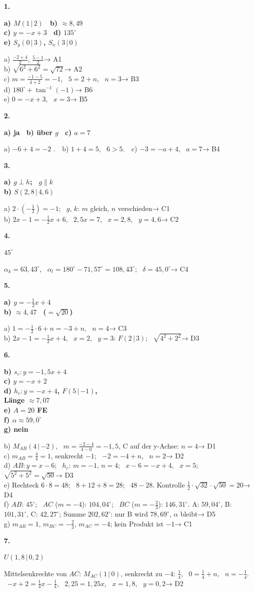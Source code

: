 \documentclass[11pt]{article}
\newcommand{\Pk}[3]{\ensuremath{#1(#2\,|\,{#3})}}
\newcommand{\lk}[2]{\par\Needspace{30mm}\vspace{6pt}\noindent\colorbox{black!12}{\makebox[9mm]{\bfseries\strut #1}}\hspace{2mm}{\bfseries #2}\par\vspace{4pt}}
\newcommand{\lsg}[3]{\par\noindent\begin{minipage}[t]{7mm}\textbf{#1}\end{minipage}%
  \begin{minipage}[t]{50mm}\raggedright\bfseries\boldmath #2\end{minipage}\hspace{3mm}%
  \begin{minipage}[t]{\dimexpr\linewidth-60mm\relax}\raggedright\small #3\end{minipage}\par\vspace{3pt}}
\newcommand{\ab}[1]{\hfill{\scriptsize\color{mbgrau}→ #1}}
\begin{document}
\lk{T}{Probetest}
\lsg{1.}{a) \Pk{M}{1}{2} \ b) $\approx 8{,}49$\\ c) $y = -x + 3$ \ d) $135^\circ$\\ e) \Pk{S_y}{0}{3}, \Pk{S_x}{3}{0}}{a) $\tfrac{-2+4}{2}$, $\tfrac{5-1}{2}$\ab{A1}\\ b) $\sqrt{6^2+6^2} = \sqrt{72}$\ab{A2}\\ c) $m = \tfrac{-1-5}{4+2} = -1$, \ $5 = 2 + n$, \ $n = 3$\ab{B3}\\ d) $180^\circ + \tan^{-1}(-1)$\ab{B6}\\ e) $0 = -x + 3$, \ $x = 3$\ab{B5}}
\lsg{2.}{a) ja \ b) über $g$ \ c) $a = 7$}{a) $-6 + 4 = -2$ \checkmark.\ \ b) $1 + 4 = 5$, \ $6 > 5$.\ \ c) $-3 = -a + 4$, \ $a = 7$\ab{B4}}
\lsg{3.}{a) $g \perp h$; \ $g \parallel k$\\ b) \Pk{S}{2{,}8}{4{,}6}}{a) $2\cdot(-\tfrac12) = -1$; \ $g$, $k$: $m$ gleich, $n$ verschieden\ab{C1}\\ b) $2x - 1 = -\tfrac12x + 6$, \ $2{,}5x = 7$, \ $x = 2{,}8$, \ $y = 4{,}6$\ab{C2}}
\lsg{4.}{$45^\circ$}{$\alpha_k = 63{,}43^\circ$, \ $\alpha_l = 180^\circ - 71{,}57^\circ = 108{,}43^\circ$; \ $\delta = 45{,}0^\circ$\ab{C4}}
\lsg{5.}{a) $y = -\tfrac12x + 4$\\ b) $\approx 4{,}47$ \ ($= \sqrt{20}$)}{a) $1 = -\tfrac12\cdot 6 + n = -3 + n$, \ $n = 4$\ab{C3}\\ b) $2x - 1 = -\tfrac12x + 4$, \ $x = 2$, \ $y = 3$: \Pk{F}{2}{3}; \ $\sqrt{4^2+2^2}$\ab{D3}}
\lsg{6.}{b) $s_c\colon y = -1{,}5x + 4$\\ c) $y = -x + 2$\\ d) $h_c\colon y = -x + 4$, \Pk{F}{5}{-1},\\ \phantom{d) }Länge $\approx 7{,}07$\\ e) $A = 20$ FE\\ f) $\alpha \approx 59{,}0^\circ$\\ g) nein}{b) \Pk{M_{AB}}{4}{-2}, \ $m = \tfrac{-2-4}{4-0} = -1{,}5$, C auf der y-Achse: $n = 4$\ab{D1}\\
c) $m_{AB} = \tfrac44 = 1$, senkrecht $-1$; \ $-2 = -4 + n$, \ $n = 2$\ab{D2}\\
d) $AB\colon y = x - 6$; \ $h_c$: $m = -1$, $n = 4$; \ $x - 6 = -x + 4$, \ $x = 5$; \ $\sqrt{5^2+5^2} = \sqrt{50}$\ab{D3}\\
e) Rechteck $6\cdot 8 = 48$; \ $8 + 12 + 8 = 28$; \ $48 - 28$. Kontrolle $\tfrac12\cdot\sqrt{32}\cdot\sqrt{50} = 20$\ab{D4}\\
f) $AB$: $45^\circ$; \ $AC$ ($m = -4$): $104{,}04^\circ$; \ $BC$ ($m = -\tfrac23$): $146{,}31^\circ$. A: $59{,}04^\circ$, B: $101{,}31^\circ$, C: $42{,}27^\circ$; Summe $202{,}62^\circ$: nur B wird $78{,}69^\circ$, $\alpha$ bleibt\ab{D5}\\
g) $m_{AB} = 1$, $m_{BC} = -\tfrac23$, $m_{AC} = -4$; kein Produkt ist $-1$\ab{C1}}
\lsg{7.}{\Pk{U}{1{,}8}{0{,}2}}{Mittelsenkrechte von $AC$: \Pk{M_{AC}}{1}{0}, senkrecht zu $-4$: $\tfrac14$, \ $0 = \tfrac14 + n$, \ $n = -\tfrac14$. \ $-x + 2 = \tfrac14x - \tfrac14$, \ $2{,}25 = 1{,}25x$, \ $x = 1{,}8$, \ $y = 0{,}2$\ab{D2}}
\end{document}
